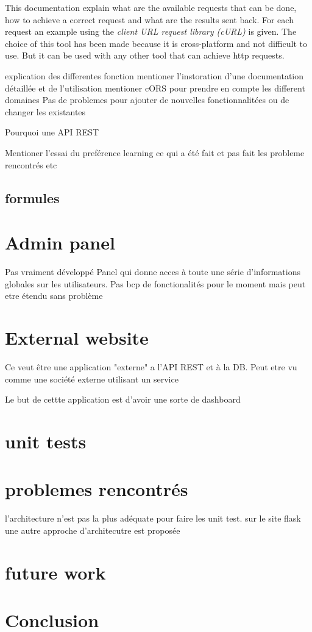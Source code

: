 This documentation explain what are the available requests that can be done, how to achieve a correct request and what are the results sent back.
For each request an example using the \textit{client URL request library (cURL)} is given. The choice of this tool has been made because  it is cross-platform and not difficult to use. But it can be used with any other tool that can achieve http requests.


explication des differentes fonction
 mentioner l'instoration d'une documentation détaillée et de l'utilisation 
 mentioner cORS pour prendre en compte les different domaines
 Pas de problemes pour ajouter de nouvelles fonctionnalitées ou de changer les existantes
 
 Pourquoi une API REST
 
 Mentioner l'essai du preférence learning ce qui a été fait et pas fait les probleme rencontrés etc
 \subsection{formules}

\section{Admin panel}
Pas vraiment développé
Panel qui donne acces à toute une série d'informations globales sur les utilisateurs. Pas bcp de fonctionalités pour le moment mais peut etre étendu sans problème

\section{External website}
Ce veut être une application "externe" a l'API REST et à la DB. Peut etre vu comme une société externe utilisant un service

Le but de cettte application est d'avoir une sorte de dashboard

\section{unit tests}

\section{problemes rencontrés}
l'architecture n'est pas  la plus adéquate pour faire les unit test. sur le site flask une autre approche d'architecutre est proposée 
\section{future work}
\section{Conclusion}
